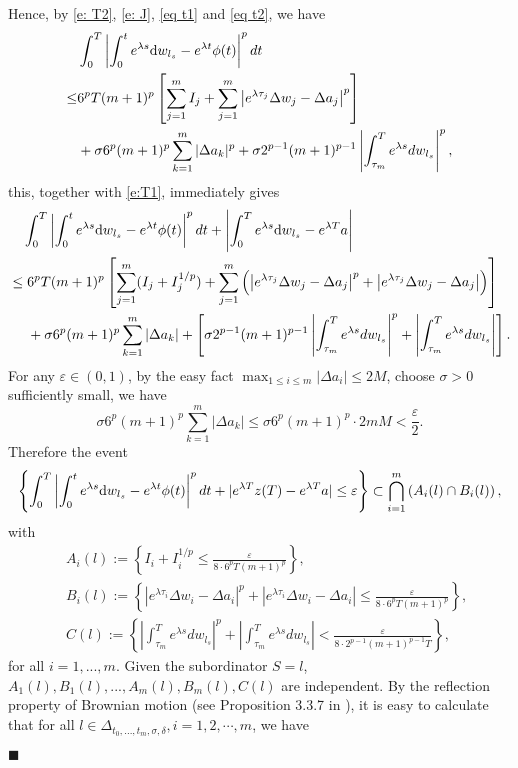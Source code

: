 \documentclass[12pt,a4paper]{article}
\theoremstyle{definition}
\theoremstyle{remark}
\numberwithin{equation}{section}
\newcommand{\e}{\varepsilon}
\newcommand{\Be}{\begin{equation}}
\newcommand{\Ee}{\end{equation}}
\newcommand{\Bes}{\begin{equation*}}
\newcommand{\Ees}{\end{equation*}}
\newcommand{\dif}{{\rm d}}
\newenvironment{proof}{\par\noindent{\bf Proof:}}{\hspace*{\fill}$\blacksquare$\par}
\begin{document}
{\begin{proof}
Hence, by \eqref{e: T2}, \eqref{e: J}, \eqref{eq t1} and \eqref{eq t2}, we have
\ \ \
\Bes
\begin{split}
&\int_0^T \left|\int_0^t e^{\lambda s}\dif w_{l_s}-e^{\lambda t} \phi(t)\right|^p dt\\
  \le & 6^{p}T( m+1)^{p} \left[\sum_{j=1}^{m} I_j+\sum_{j=1}^{m}\left|e^{\lambda \tau_j} \Delta w_j-\Delta a_j\right|^p\right] \\
&+\sigma 6^{p} (m+1)^{p} \sum_{k=1}^m |\Delta a_k|^p +\sigma 2^{p-1}(m+1)^{p-1} \left|\int_{\tau_m}^T e^{\lambda s}d w_{l_s}\right|^p,
\end{split}
\Ees
this, together with \eqref{e:T1}, immediately gives
\ \ \
\Be
\begin{split}
& \ \ \ \int_0^T \left|\int_0^t e^{\lambda s}\dif w_{l_s}-e^{\lambda t} \phi(t)\right|^p dt+\left|\int_0^T e^{\lambda s}\dif w_{l_s}-e^{\lambda T}a\right| \\
& \le  6^{p}T( m+1)^{p} \left[\sum_{j=1}^{m} (I_j+I_j^{1/p})+\sum_{j=1}^{m}\left(\left|e^{\lambda \tau_j} \Delta w_j-\Delta a_j\right|^p+\left|e^{\lambda \tau_j} \Delta w_j-\Delta a_j\right|\right)\right] \\
& \ \ \ \ +\sigma 6^{p} (m+1)^{p}\sum_{k=1}^m |\Delta a_k|+\left[\sigma   2^{p-1}(m+1)^{p-1} \left|\int_{\tau_m}^T e^{\lambda s}d w_{l_s}\right|^p+\left|\int_{\tau_m}^T e^{\lambda s}d w_{l_s}\right|\right].
\end{split}
\Ee
For any $\e \in (0,1)$, by the easy fact $\max_{1 \le i \le m} |\Delta a_i| \le 2M$, choose $\sigma>0$ sufficiently small,    we have
$$\sigma 6^{p} (m+1)^{p}\sum_{k=1}^m |\Delta a_k|\le \sigma 6^{p} (m+1)^{p}\cdot 2 mM<\frac{\e}{2}.$$
Therefore the event
$$\left\{\int_0^T \left|\int_0^t e^{\lambda s}\dif w_{l_s}-e^{\lambda t} \phi(t)\right|^p dt+|e^{\lambda T} z(T)-e^{\lambda T} a| \le \e\right\}\subset \bigcap_{i=1}^{m} \left(A_i(l) \cap B_i(l)\right),$$
with
 \begin{align*}
& \ A_i(l):=\left\{I_i+I^{1/p}_i \le \frac{\e}{ 8\cdot6^{p}T( m+1)^{p}}\right\}, \\
& \ B_i(l):=\left\{\left|e^{\lambda \tau_i} \Delta w_i-\Delta a_i\right|^p+\left|e^{\lambda \tau_i} \Delta w_i-\Delta a_i\right| \le \frac{\e}{8\cdot6^{p}T( m+1)^{p}}\right\}, \\
& \ C(l):=\left\{   \left|\int_{\tau_m}^T e^{\lambda s}d w_{l_s}\right|^p+\left|\int_{\tau_m}^T e^{\lambda s}d w_{l_s}\right|<\frac{\e} {8\cdot 2^{p-1}(m+1)^{p-1} T}\right\},
\end{align*}
for all $i=1,...,m$.  Given the subordinator $S=l$, $A_1(l), B_1(l), ..., A_{m}(l), B_{m}(l), C(l)$ are independent. By the reflection property of Brownian motion (see Proposition 3.3.7 in \cite{RY}), it is easy to calculate that for all $l \in \Delta_{t_0,...,t_m,\sigma, \delta}, i=1,2,\cdots, m$, we have

\end{proof}}
\end{document}
